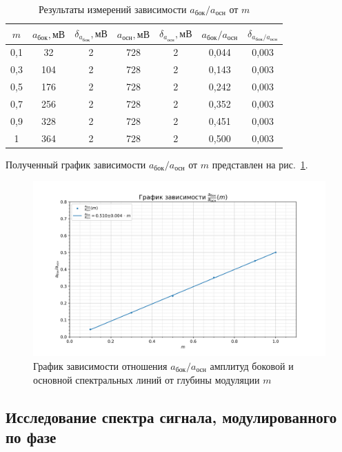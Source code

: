 \documentclass[a4paper, 12pt]{article}
\begin{document}
\begin{table}[h!]
\begin{center}
\begin{tabular}{|c|c|c|c|c|c|c|}
\hline
$m$ & $a_{бок}, мВ$ & $\delta_{a_{бок}}, мВ$ & $a_{осн}, мВ$ & $\delta_{a_{осн}}, мВ$ & $a_{бок}/a_{осн}$ & $\delta_{a_{бок}/a_{осн}}$ \\ \hline
0,1 & 32 & 2 & 728 & 2 & 0,044 & 0,003 \\ \hline
0,3 & 104 & 2 & 728 & 2 & 0,143 & 0,003 \\ \hline
0,5 & 176 & 2 & 728 & 2 & 0,242 & 0,003 \\ \hline
0,7 & 256 & 2 & 728 & 2 & 0,352 & 0,003 \\ \hline
0,9 & 328 & 2 & 728 & 2 & 0,451 & 0,003 \\ \hline
1 & 364 & 2 & 728 & 2 & 0,500 & 0,003 \\ \hline
\end{tabular}
\end{center}
\caption{Результаты измерений зависимости $a_{бок}/a_{осн}$ от $m$}
\label{tab4}
\end{table}

Полученный график зависимости $a_{бок}/a_{осн}$ от $m$ представлен на рис.~\ref{plot3}.

\begin{figure}[h!]
\begin{flushleft}
    \includegraphics[scale=0.7]{3.6.1_3.png}
\end{flushleft}
\caption{График зависимости отношения $a_{бок}/a_{осн}$ амплитуд боковой и основной спектральных линий от глубины модуляции $m$}
\label{plot3}
\end{figure}

\newpage

\subsection{Исследование спектра сигнала, модулированного по фазе}
\end{document}
